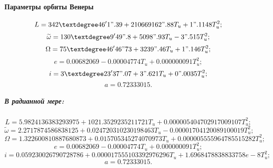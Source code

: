 \paragraph{Параметры орбиты Венеры}
$$L = 342°46'1".39 + 210669162".88 T_u + 1".1148 T_u^2;$$
$$\widetilde{\omega} = 130°9'49".8 + 5098".93 T_u - 3".515 T_u^2;$$
$$\Omega = 75°46'46"73 + 3239".46 T_u + 1".146 T_u^2;$$
$$e = 0.00682069 - 0.00004774 T_u + 0.000000091 T_u^2;$$
$$i = 3°23'37".07 + 3".621 T_u + 0".0035 T_u^2;$$
$$a = 0.72333015.$$

\subparagraph{В радианной мере:}
$$L = 5.9824136383293975 + 1021.3529235211721 T_u + 0.000005404702917009107 T_u^2;$$
$$\widetilde{\omega} = 2.2717874586838125 + 0.024720310230198463 T_u - 0.00001704120089100019 T_u^2;$$
$$\Omega = 1.322600810887680873 + 0.015705345274070973 T_u + 0.000005555964785515282 T_u^2;$$
$$e = 0.00682069 - 0.00004774 T_u + 0.000000091 T_u^2;$$
$$i = 0.059230026790728786 + 0.000017555103392976296 T_u + 1.6968478838833758e-8 T_u^2;$$
$$a = 0.72333015.$$